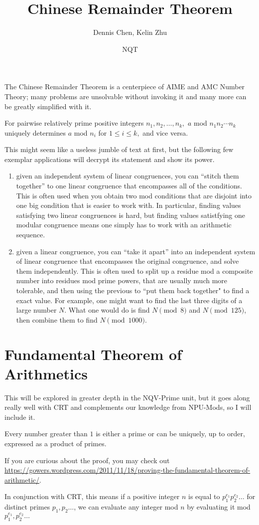 \documentclass[mast]{lucky}
\title{Chinese Remainder Theorem}
\author{Dennis Chen, Kelin Zhu}
\date{NQT}
\begin{document}
\maketitle

The Chinese Remainder Theorem is a centerpiece of AIME and AMC Number Theory; many problems are unsolvable without invoking it and many more can be greatly simplified with it.

\begin{theo}
For pairwise relatively prime positive integers $n_1,n_2,\ldots,n_k,$ $a$ mod $n_1n_2\cdots n_k$ uniquely determines $a$ mod $n_i$ for $1\leq i\leq k,$ and vice versa.
\end{theo}

This might seem like a useless jumble of text at first, but the following few exemplar applications will decrypt its statement and show its power.
\begin{enumerate}
\item given an independent system of linear congruences, you can ``stitch them together'' to one linear congruence that encompasses all of the conditions. This is often used when you obtain two mod conditions that are disjoint into one big condition that is easier to work with. In particular, finding values satisfying two linear congruences is hard, but finding values satistfying one modular congruence means one simply has to work with an arithmetic sequence.
\item given a linear congruence, you can ``take it apart'' into an independent system of linear congruence that encompasses the original congruence, and solve them independently. This is often used to split up a residue mod a composite number into residues mod prime powers, that are usually much more tolerable, and then using the previous to ``put them back together" to find a exact value. For example, one might want to find the last three digits of a large number $N$. What one would do is find $N \pmod{8}$ and $N \pmod{125}$, then combine them to find $N\pmod{1000}$.
\end{enumerate}
\section{Fundamental Theorem of Arithmetics}
This will be explored in greater depth in the NQV-Prime unit, but it goes along really well with CRT and complements our knowledge from NPU-Mods, so I will include it.

\begin{theo}
Every number greater than $1$ is either a prime or can be uniquely, up to order, expressed as a product of primes.
\end{theo}

If you are curious about the proof, you may check out \url{https://gowers.wordpress.com/2011/11/18/proving-the-fundamental-theorem-of-arithmetic/}.
\hfill

In conjunction with CRT, this means if a positive integer $n$ is equal to $p_1^{e_1}p_2^{e_2}\ldots$ for distinct primes $p_1,p_2\ldots$, we can evaluate any integer mod $n$ by evaluating it mod $p_1^{e_1},p_2^{e_2}\ldots$
\end{document}
